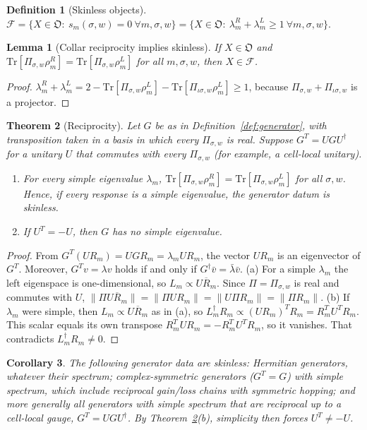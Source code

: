 \documentclass[11pt]{article}
\newtheorem{theorem}{Theorem}
\newtheorem{lemma}[theorem]{Lemma}
\newtheorem{corollary}[theorem]{Corollary}
\theoremstyle{definition}
\newtheorem{definition}{Definition}
\theoremstyle{remark}
\newcommand{\Tr}{\mathrm{Tr}}
\newcommand{\Obj}{\mathfrak{O}}
\newcommand{\Free}{\mathcal{F}}
\newcommand{\isig}{\iota\sigma}
\begin{document}
\begin{definition}[Skinless objects]\label{def:free}
$\Free=\{X\in\Obj:\ s_m(\sigma,w)=0\ \forall m,\sigma,w\}=\{X\in\Obj:\ \lambda^R_m+\lambda^L_m\ge1\ \forall m,\sigma,w\}$.
\end{definition}

\begin{lemma}[Collar reciprocity implies skinless]\label{lem:collarrec}
If $X\in\Obj$ and $\Tr[\Pi_{\sigma,w}\rho^R_m]=\Tr[\Pi_{\sigma,w}\rho^L_m]$ for all $m,\sigma,w$, then $X\in\Free$.
\end{lemma}
\begin{proof}
$\lambda^R_m+\lambda^L_m=2-\Tr[\Pi_{\sigma,w}\rho^L_m]-\Tr[\Pi_{\isig,w}\rho^L_m]\ge1$, because $\Pi_{\sigma,w}+\Pi_{\isig,w}$ is a projector.
\end{proof}

\begin{theorem}[Reciprocity]\label{thm:recip}
Let $G$ be as in Definition~\ref{def:generator}, with transposition taken in a basis in which every $\Pi_{\sigma,w}$ is real. Suppose $G^{T}=UGU^\dagger$ for a unitary $U$ that commutes with every $\Pi_{\sigma,w}$ (for example, a cell-local unitary).
\begin{enumerate}
\item[(a)] For every simple eigenvalue $\lambda_m$, $\Tr[\Pi_{\sigma,w}\rho^R_m]=\Tr[\Pi_{\sigma,w}\rho^L_m]$ for all $\sigma,w$. Hence, if every response is a simple eigenvalue, the generator datum is skinless.
\item[(b)] If $U^{T}=-U$, then $G$ has no simple eigenvalue.
\end{enumerate}
\end{theorem}
\begin{proof}
From $G^{T}(UR_m)=UGR_m=\lambda_mUR_m$, the vector $UR_m$ is an eigenvector of $G^{T}$. Moreover, $G^{T}v=\lambda v$ holds if and only if $G^\dagger\bar v=\bar\lambda\bar v$.
(a) For a simple $\lambda_m$ the left eigenspace is one-dimensional, so $L_m\propto\overline{UR_m}$. Since $\Pi=\Pi_{\sigma,w}$ is real and commutes with $U$, $\|\Pi\overline{UR_m}\|=\|\Pi UR_m\|=\|U\Pi R_m\|=\|\Pi R_m\|$.
(b) If $\lambda_m$ were simple, then $L_m\propto\overline{UR_m}$ as in (a), so $L_m^\dagger R_m\propto(UR_m)^{T}R_m=R_m^{T}U^{T}R_m$. This scalar equals its own transpose $R_m^{T}UR_m=-R_m^{T}U^{T}R_m$, so it vanishes. That contradicts $L_m^\dagger R_m\ne0$.
\end{proof}

\begin{corollary}\label{cor:hermitian}
The following generator data are skinless: Hermitian generators, whatever their spectrum; complex-symmetric generators ($G^{T}=G$) with simple spectrum, which include reciprocal gain/loss chains with symmetric hopping; and more generally all generators with simple spectrum that are reciprocal up to a cell-local gauge, $G^T=UGU^\dagger$. By Theorem~\ref{thm:recip}(b), simplicity then forces $U^T\neq-U$.
\end{corollary}
\end{document}
